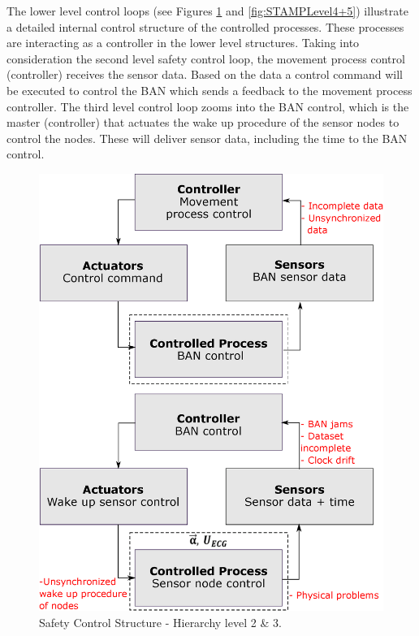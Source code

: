 \documentclass[10pt,journal,compsoc]{IEEEtran}
\begin{document}
	The lower level control loops (see Figures \ref{fig:STAMPLevel2+3} and \ref{fig:STAMPLevel4+5}) illustrate a detailed internal control structure of the controlled processes. These processes are interacting as a controller in the lower level structures. Taking into consideration the second level safety control loop, the movement process control (controller) receives the sensor data. Based on the data a control command will be executed to control the BAN which sends a feedback to the movement process controller. The third level control loop zooms into the BAN control, which is the master (controller) that actuates the wake up procedure of the sensor nodes to control the nodes. These will deliver sensor data, including the time to the BAN control.
	\begin{figure}[!ht]
		\centering
		\includegraphics[scale=0.35]{Images/STAMP2+3level.eps}
		\caption[Safety Control Structure - Hierarchy level 2 \& 3]{Safety Control Structure - Hierarchy level 2 \& 3.}
		\label{fig:STAMPLevel2+3}
	\end{figure} 
\end{document}
